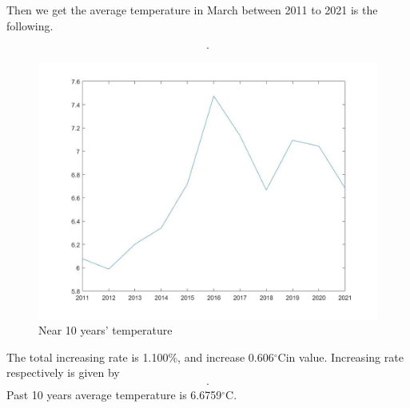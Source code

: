 \documentclass{apmcmthesis}
\def\oc{$^{\circ}$C\;}
\begin{document}
  Then we get the average temperature in March between 2011 to 2021 is the following. 
  
  \begin{align*}
    [6.0780,5.9890, 6.2030, 6.3420 , 6.7220 ,7.4750 , 7.1340 , 6.6680 , 7.0950  ,7.0450 ,6.6840].
  \end{align*}
  
  \begin{figure}[htbp]
    \centering
    \includegraphics[scale=0.2]{past 10 avg.jpg}
    \caption{Near 10 years' temperature}
  \end{figure}
  
  The total increasing rate is 1.100\%, and increase 0.606\oc in value.
  Increasing rate respectively is given by
  \begin{align*}
    [ -0.0941,-0.0146,0.0357,0.0224,0.0599,0.1120, -0.0456,-0.0653, 0.0640,-0.0070,-0.0512].
  \end{align*}
  Past 10 years average temperature is 6.6759\oc. 
  
\end{document}
